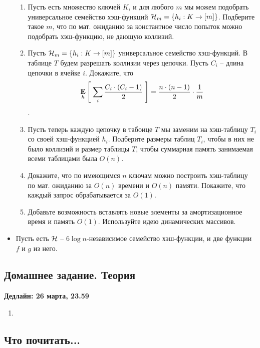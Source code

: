 \begin{itemize}
\begin{enumerate}
    \item Пусть есть множество ключей $K$, и для любого $m$ мы можем подобрать
      универсальное семейство хэш-функций $\mathcal{H}_m = \{ h_i : K \rightarrow [m] \}$.
      Подберите такое $m$, что по мат. ожиданию за константное число попыток
      можно подобрать хэш-функцию, не дающую коллизий.

    \item Пусть $\mathcal{H}_m = \{ h_i : K \rightarrow [m] \}$ универсальное семейство 
      хэш-функций.  В таблице $T$ будем разрешать коллизии через цепочки. 
      Пусть $C_i$ -- длина цепочки в ячейке $i$. Докажите, что 
        $$\underset{h}{\textbf{E}}\left[ \;  \sum_i \frac{C_i \cdot (C_i - 1)}{2}  \;\right] = \frac{n \cdot (n - 1)}{2} \cdot \frac{1}{m}$$.

    \item Пусть теперь каждую цепочку в табоице $T$ мы заменим на хэш-таблицу 
    $T_i$ со своей хэш-функцией $h_i$. Подберите размеры таблиц $T_i$, чтобы 
    в них не было коллизий и размер таблицы $T$, чтобы суммарная память занимаемая
    всеми таблицами была $O(n)$.

    \item Докажите, что по имеющимся $n$ ключам можно построить хэш-таблицу по 
    мат. ожиданию за $O(n)$ времени и $O(n)$ памяти. Покажите, что каждый запрос
    обрабатывается за $O(1)$.
    
    \item Добавьте возможность вставлять новые элементы за амортизационное время и память
    $O(1)$. Используйте идею динамических массивов.

  \end{enumerate}

  \item Пусть есть $\mathcal{H}$ -- $6 \log n$-независимое семейство хэш-функции, и
  две функции $f$ и $g$ из него.


\end{itemize}


\subsection{Домашнее задание. Теория}
\textbf{Дедлайн: 26 марта, 23.59}

\begin{enumerate}

  \item 
\end{enumerate}

\subsection{Что почитать...}

